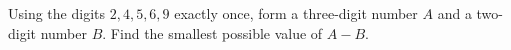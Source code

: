 Using the digits $2, 4, 5, 6, 9$ exactly once, form a three-digit number $A$ and a two-digit number $B$. Find the smallest possible value of $A-B$.
